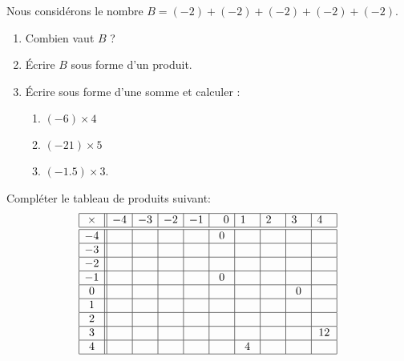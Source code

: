
Nous considérons le nombre \( B=(-2)+(-2)+(-2)+(-2)+(-2)\).

\begin{enumerate}
    \item
        Combien vaut \( B\) ?
    \item
        Écrire \( B\) sous forme d'un produit.
    \item
        Écrire sous forme d'une somme et calculer :
        \begin{enumerate}
            \item \( (-6)\times 4\)
            \item \( (-21)\times 5\)
            \item\( (-1.5)\times 3\).
        \end{enumerate}
\end{enumerate}

Compléter le tableau de produits suivant:
\begin{equation*}
    \begin{array}[]{|c||c|c|c|c|c|c|c|c|c|}
        \hline
        \times&-4&-3&-2&-1&\hphantom{-}0&1\hphantom{-}&2\hphantom{-}&3\hphantom{-}&4\hphantom{-}\\
        \hline\hline
        -4&&&&&0&&&&\\
        \hline
        -3&&&&&&&&&\\
        \hline
        -2&&&&&&&&&\\
        \hline
        -1&&&&&0&&&&\\
        \hline
        0&&&&&&&&0&\\
        \hline
        1&&&&&&&&&\\
        \hline
        2&&&&&&&&&\\
        \hline
        3&&&&&&&&&12\\
        \hline
        4&&&&&&4&&&\\
        \hline
    \end{array}
\end{equation*}
